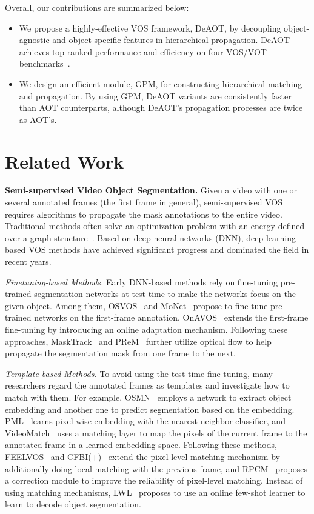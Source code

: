 \documentclass{article}
\begin{document}
Overall, our contributions are summarized below: 
\begin{itemize}
\vspace{-0.5em}
\item  We propose a highly-effective VOS framework, DeAOT, by decoupling object-agnostic and object-specific features in hierarchical propagation. DeAOT achieves top-ranked performance and efficiency on four VOS/VOT benchmarks~\cite{youtubevos,davis2017,davis2016,vot2020}.
\vspace{-0.5em}
\item  We design an efficient module, GPM, for constructing hierarchical matching and propagation. By using GPM, DeAOT variants are consistently faster than AOT counterparts, although DeAOT's propagation processes are twice as AOT's.
\end{itemize}



 
\section{Related Work}
\noindent\textbf{Semi-supervised Video Object Segmentation.}
Given a video with one or several annotated frames (the first frame in general), semi-supervised VOS~\cite{wang2021survey} requires algorithms to propagate the mask annotations to the entire video. Traditional methods often solve an optimization problem with an energy defined over a graph structure~\cite{tradition1,tradition3,tradition2}. Based on deep neural networks (DNN), deep learning based VOS methods have achieved significant progress and dominated the field in recent years.

\textit{Finetuning-based Methods.} Early DNN-based methods rely on fine-tuning pre-trained segmentation networks at test time to make the networks focus on the given object. Among them, OSVOS~\cite{osvos} and MoNet~\cite{xiao2018monet} propose to fine-tune pre-trained networks on the first-frame annotation. OnAVOS~\cite{onavos} extends the first-frame fine-tuning by introducing an online adaptation mechanism. Following these approaches, MaskTrack~\cite{masktrack} and PReM~\cite{premvos} further utilize optical flow to help propagate the segmentation mask from one frame to the next.

\textit{Template-based Methods.} To avoid using the test-time fine-tuning, many researchers regard the annotated frames as templates and investigate how to match with them. For example, OSMN~\cite{osmn} employs a network to extract object embedding and another one to predict segmentation based on the embedding. PML~\cite{pml} learns pixel-wise embedding with the nearest neighbor classifier, and VideoMatch~\cite{videomatch} uses a matching layer to map the pixels of the current frame to the annotated frame in a learned embedding space. Following these methods, FEELVOS~\cite{feelvos} and CFBI(+)~\cite{cfbi,cfbip} extend the pixel-level matching mechanism by additionally doing local matching with the previous frame, and RPCM~\cite{rpcm} proposes a correction module to improve the reliability of pixel-level matching. Instead of using matching mechanisms, LWL~\cite{LWLVOS} proposes to use an online few-shot learner to learn to decode object segmentation.
\end{document}

